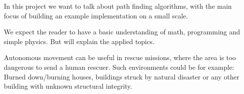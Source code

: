 In this project we want to talk about path finding algorithms,
with the main focus of building an example implementation on a small scale.

We expect the reader to have a basic understanding of math, programming and simple physics.
But will explain the applied topics.

Autonomous movement can be useful in rescue missions,
where the area is too dangerous to send a human rescuer.
Such environments could be for example:
Burned down/burning houses, buildings struck by natural disaster
or any other building with unknown structural integrity.
